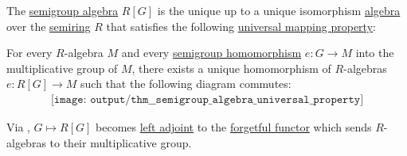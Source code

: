 \begin{theorem}\label{thm:semigroup_algebra_universal_property}
  The \hyperref[def:semigroup_algebra]{semigroup algebra} \( R[G] \) is the unique up to a unique isomorphism \hyperref[def:algebra_over_semiring]{algebra} over the \hyperref[def:semiring]{semiring} \( R \) that satisfies the following \hyperref[rem:universal_mapping_property]{universal mapping property}:
  \begin{displayquote}
    For every \( R \)-algebra \( M \) and every \hyperref[def:semigroup/homomorphism]{semigroup homomorphism} \( e: G \to M \) into the multiplicative group of \( M \), there exists a unique homomorphism of \( R \)-algebras \( e: R[G] \to M \) such that the following diagram commutes:
    \begin{equation}\label{eq:thm:semigroup_algebra_universal_property}
      \begin{aligned}
        \texttt{[image: output/thm\_\_semigroup\_algebra\_universal\_property]}
      \end{aligned}
    \end{equation}
  \end{displayquote}
\end{theorem}
\begin{comments}
  \item Via , \( G \mapsto R[G] \) becomes \hyperref[def:category_adjunction]{left adjoint} to the \hyperref[def:concrete_category]{forgetful functor} which sends \( R \)-algebras to their multiplicative group.
\end{comments}
